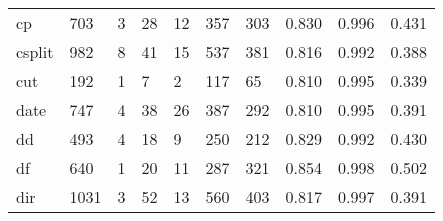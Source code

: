 \begin{longtable}{lp{1.3cm}p{1.3cm}p{1.3cm}p{1.3cm}p{1.3cm}p{1.3cm}p{1.3cm}p{1.3cm}p{1.3cm}}
cp        &                    703 &                                  3 &                                28 &                               12 &                               357 &                             303 &                                   0.830 &                                  0.996 &                                0.431 \\
csplit    &                    982 &                                  8 &                                41 &                               15 &                               537 &                             381 &                                   0.816 &                                  0.992 &                                0.388 \\
cut       &                    192 &                                  1 &                                 7 &                                2 &                               117 &                              65 &                                   0.810 &                                  0.995 &                                0.339 \\
date      &                    747 &                                  4 &                                38 &                               26 &                               387 &                             292 &                                   0.810 &                                  0.995 &                                0.391 \\
dd        &                    493 &                                  4 &                                18 &                                9 &                               250 &                             212 &                                   0.829 &                                  0.992 &                                0.430 \\
df        &                    640 &                                  1 &                                20 &                               11 &                               287 &                             321 &                                   0.854 &                                  0.998 &                                0.502 \\
dir       &                   1031 &                                  3 &                                52 &                               13 &                               560 &                             403 &                                   0.817 &                                  0.997 &                                0.391 \\

\end{longtable}
